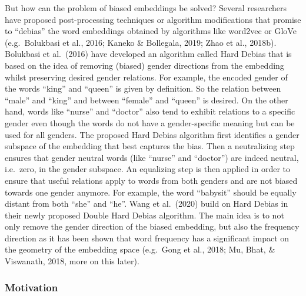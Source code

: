 \documentclass[
  english,
  man,floatsintext]{apa6}
\begin{document}
But how can the problem of biased embeddings be solved? Several researchers have proposed post-processing techniques or algorithm modifications that promise to \enquote{debias} the word embeddings obtained by algorithms like word2vec or GloVe (e.g.~Bolukbasi et al., 2016; Kaneko \& Bollegala, 2019; Zhao et al., 2018b).
Bolukbasi et al.~(2016) have developed an algorithm called Hard Debias that is based on the idea of removing (biased) gender directions from the embedding whilst preserving desired gender relations. For example, the encoded gender of the words \enquote{king} and \enquote{queen} is given by definition. So the relation between \enquote{male} and \enquote{king} and between \enquote{female} and \enquote{queen} is desired. On the other hand, words like \enquote{nurse} and \enquote{doctor} also tend to exhibit relations to a specific gender even though the words do not have a gender-specific meaning but can be used for all genders. The proposed Hard Debias algorithm first identifies a gender subspace of the embedding that best captures the bias. Then a neutralizing step ensures that gender neutral words (like \enquote{nurse} and \enquote{doctor}) are indeed neutral, i.e.~zero, in the gender subspace. An equalizing step is then applied in order to ensure that useful relations apply to words from both genders and are not biased towards one gender anymore. For example, the word \enquote{babysit} should be equally distant from both \enquote{she} and \enquote{he}.
Wang et al.~(2020) build on Hard Debias in their newly proposed Double Hard Debias algorithm. The main idea is to not only remove the gender direction of the biased embedding, but also the frequency direction as it has been shown that word frequency has a significant impact on the geometry of the embedding space (e.g.~Gong et al., 2018; Mu, Bhat, \& Viswanath, 2018, more on this later).

\hypertarget{motivation}{%
\subsubsection{Motivation}\label{motivation}}
\end{document}
